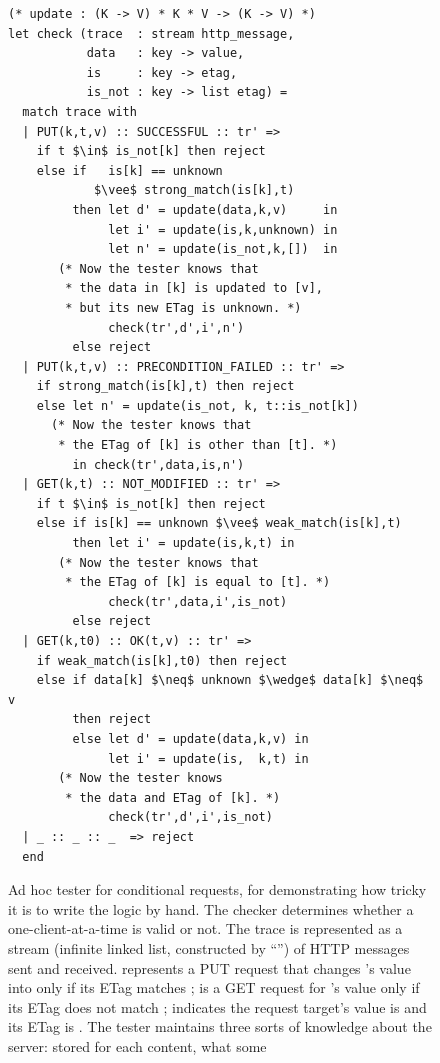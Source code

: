 \begin{figure}
  \begin{lstlisting}[style=customcoq,mathescape=true]
(* update : (K -> V) * K * V -> (K -> V) *)
let check (trace  : stream http_message,
           data   : key -> value,
           is     : key -> etag,
           is_not : key -> list etag) =
  match trace with
  | PUT(k,t,v) :: SUCCESSFUL :: tr' =>
    if t $\in$ is_not[k] then reject
    else if   is[k] == unknown
            $\vee$ strong_match(is[k],t)
         then let d' = update(data,k,v)     in
              let i' = update(is,k,unknown) in
              let n' = update(is_not,k,[])  in
       (* Now the tester knows that
        * the data in [k] is updated to [v],
        * but its new ETag is unknown. *)
              check(tr',d',i',n')
         else reject
  | PUT(k,t,v) :: PRECONDITION_FAILED :: tr' =>
    if strong_match(is[k],t) then reject
    else let n' = update(is_not, k, t::is_not[k])
      (* Now the tester knows that
       * the ETag of [k] is other than [t]. *)
         in check(tr',data,is,n')
  | GET(k,t) :: NOT_MODIFIED :: tr' =>
    if t $\in$ is_not[k] then reject
    else if is[k] == unknown $\vee$ weak_match(is[k],t)
         then let i' = update(is,k,t) in
       (* Now the tester knows that
        * the ETag of [k] is equal to [t]. *)
              check(tr',data,i',is_not)
         else reject
  | GET(k,t0) :: OK(t,v) :: tr' =>
    if weak_match(is[k],t0) then reject
    else if data[k] $\neq$ unknown $\wedge$ data[k] $\neq$ v
         then reject
         else let d' = update(data,k,v) in
              let i' = update(is,  k,t) in
       (* Now the tester knows
        * the data and ETag of [k]. *)
              check(tr',d',i',is_not)
  | _ :: _ :: _  => reject
  end
  \end{lstlisting}
  \caption{Ad hoc tester for \http conditional requests, for demonstrating how
    tricky it is to write the logic by hand.  The checker determines whether a
    one-client-at-a-time  is valid or not.  The trace is represented
    as a stream (infinite linked list, constructed by ``\ilc{::}'') of HTTP
    messages sent and received.
     represents a PUT
    request that changes 's value into  only if its ETag matches
    ;  is a GET request for 's value only if its
    ETag does not match ;  indicates the request target's
    value is  and its ETag is .  The tester maintains three
    sorts of  knowledge about
    the server:  stored for each content, what some
}
\end{figure}
